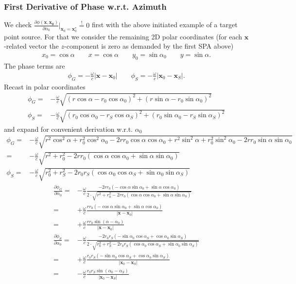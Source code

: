 \documentclass[a4paper,BCOR=15mm,10pt,twoside]{scrartcl}
\newcommand\wc{\frac{\omega}{c}}  %
\newcommand\azx{\alpha}  %
\renewcommand{\vec}[1]{\mathbf{#1}}  %
\begin{document}
\subsubsection{First Derivative of Phase w.r.t. Azimuth}
We check $\frac{\partial \phi(\vec{x}, \vec{x_0})}{\partial \azx_0}\big|_{\vec{x}_0=\vec{x}_0^*} \stackrel{!}{=} 0$ first with the above initiated example of a target point source.
For that we consider the remaining 2D polar coordinates (for each $\vec{x}$-related vector the $z$-component is zero as demanded by the first SPA above)
\begin{align}
x_0 = \cos\azx\qquad x = \cos\azx\qquad y_0 = \sin\azx_0\qquad y = \sin\azx.
\end{align}
The phase terms are
\begin{align}
\phi_G = -\wc |\vec{x} -\vec{x}_0|\qquad\phi_S = -\wc |\vec{x}_0 - \vec{x}_S|.
\end{align}
Recast in polar coordinates
\begin{align}
\phi_G =& -\wc \sqrt{(r \cos\azx-r_0 \cos\azx_0)^2 + (r \sin\azx-r_0 \sin\azx_0)^2}\\
\phi_S =& -\wc \sqrt{(r_0 \cos\azx_0-r_S \cos\azx_S)^2 + (r_0 \sin\azx_0-r_S \sin\azx_S)^2}
\end{align}
and expand for convenient derivation w.r.t. $\azx_0$
\begin{align}
\phi_G =& -\wc \sqrt{r^2 \cos^2\azx + r_0^2 \cos^2\azx_0 -2 r r_0 \cos\azx \cos\azx_0 + r^2 \sin^2\azx + r_0^2 \sin^2\azx_0 -2 r r_0 \sin\azx \sin\azx_0}\\
=& -\wc \sqrt{r^2 + r_0^2 - 2 r r_0 (\cos\azx \cos\azx_0 + \sin\azx \sin\azx_0)}\\
\phi_S =& -\wc \sqrt{r_0^2 + r_S^2 - 2 r_0 r_S (\cos\azx_0 \cos\azx_S + \sin\azx_0 \sin\azx_S)}
\end{align}
\begin{align}
\frac{\partial \phi_G}{\partial \azx_0} =& -\wc \frac{- 2 r r_0 (-\cos\azx\sin\azx_0+\sin\azx \cos\azx_0)}{2\cdot \sqrt{r^2 + r_0^2 - 2 r r_0 (\cos\azx \cos\azx_0 + \sin\azx \sin\azx_0)}}\\
=& + \wc \frac{r r_0 (-\cos\azx\sin\azx_0+\sin\azx \cos\azx_0)}{|\vec{x} -\vec{x}_0|}\\
=& + \wc \frac{r r_0 \sin(\azx-\azx_0)}{|\vec{x} -\vec{x}_0|}\\
\frac{\partial \phi_S}{\partial \azx_0} =& -\wc \frac{- 2 r_0 r_S (-\sin\azx_0\cos\azx_S+\cos\azx_0\sin\azx_S)}{2\cdot \sqrt{r_0^2 + r_S^2 - 2 r_0 r_S (\cos\azx_0 \cos\azx_S + \sin\azx_0 \sin\azx_S)}}\\
=& +\wc \frac{r_0 r_S (-\sin\azx_0\cos\azx_S+\cos\azx_0\sin\azx_S)}{|\vec{x}_0 - \vec{x}_S|}\\
=& -\wc \frac{r_0 r_S \sin(\azx_0 - \azx_S)}{|\vec{x}_0 - \vec{x}_S|}
\end{align}
\end{document}
